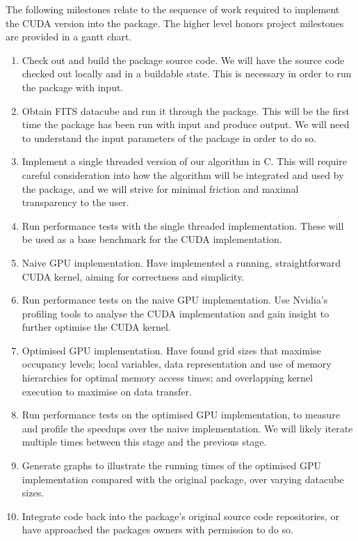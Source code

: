 \documentclass[prodmode,acmtecs]{acmsmall} \usepackage[ruled]{algorithm2e}
\begin{document}
The following milestones relate to the sequence of work required to implement the CUDA version into the package. The higher level honors project milestones are provided in a gantt chart.


\begin{enumerate}
   \item Check out and build the package source code. We will have the source code checked out locally and in a buildable state. This is necessary in order to run the package with input.
   \item Obtain FITS datacube and run it through the package. This will be the first time the package has been run with input and produce output. We will need to understand the input parameters of the package in order to do so.
   \item Implement a single threaded version of our algorithm in C. This will require careful consideration into how the algorithm will be integrated and used by the package, and we will strive for minimal friction and maximal transparency to the user.
   \item Run performance tests with the single threaded implementation. These will be used as a base benchmark for the CUDA implementation.
   \item Naive GPU implementation. Have implemented a running, straightforward CUDA kernel, aiming for correctness and simplicity.
   \item Run performance tests on the naive GPU implementation. Use Nvidia’s profiling tools to analyse the CUDA implementation and gain insight to further optimise the CUDA kernel.
   \item Optimised GPU implementation. Have found grid sizes that maximise occupancy levels; local variables, data representation and use of memory hierarchies for optimal memory access times; and overlapping kernel execution to maximise on data transfer.
   \item Run performance tests on the optimised GPU implementation, to measure and profile the speedups over the naive implementation. We will likely iterate multiple times between this stage and the previous stage.
   \item Generate graphs to illustrate the running times of the optimised GPU implementation compared with the original package, over varying datacube sizes.
   \item Integrate code back into the package’s original source code repositories, or have approached the packages owners with permission to do so.
\end{enumerate}
\end{document}
